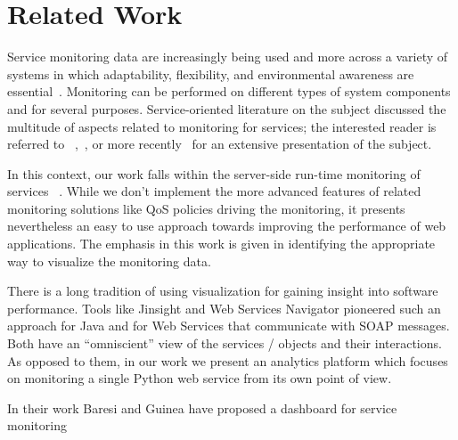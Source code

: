
\section{Related Work}
\label{sec:related}

Service monitoring data are increasingly being used and more across a variety of systems in which adaptability, flexibility, and environmental awareness are essential~\cite{pernici2016monitoring}. Monitoring can be performed on different types of system components and for several purposes. Service-oriented literature on the subject discussed the multitude of aspects related to monitoring for services; the interested reader is referred to ~\cite{ghezzi2007run},~\cite{metzger2010analytical}, or more recently~\cite{pernici2016monitoring} for an extensive presentation of the subject. 

In this context, our work falls within the server-side run-time monitoring of services ~\cite{ghezzi2007run}. While we don't implement the more advanced features of related monitoring solutions like QoS policies driving the monitoring, it presents nevertheless an easy to use approach towards improving the performance of web applications. The emphasis in this work is given in identifying the appropriate way to visualize the monitoring data.
  
There is a long tradition of using visualization for gaining insight into software performance. Tools like Jinsight \cite{Pauw02a} and Web Services Navigator \cite{Pauw05} pioneered such an approach for Java and for Web Services that communicate with SOAP messages. Both have an ``omniscient'' view of the services / objects and their interactions. As opposed to them, in our work we present an analytics platform which focuses on monitoring a single Python web service from its own point of view.


In their work Baresi and Guinea have proposed a dashboard for service monitoring \cite{Bare13-monitoring}


